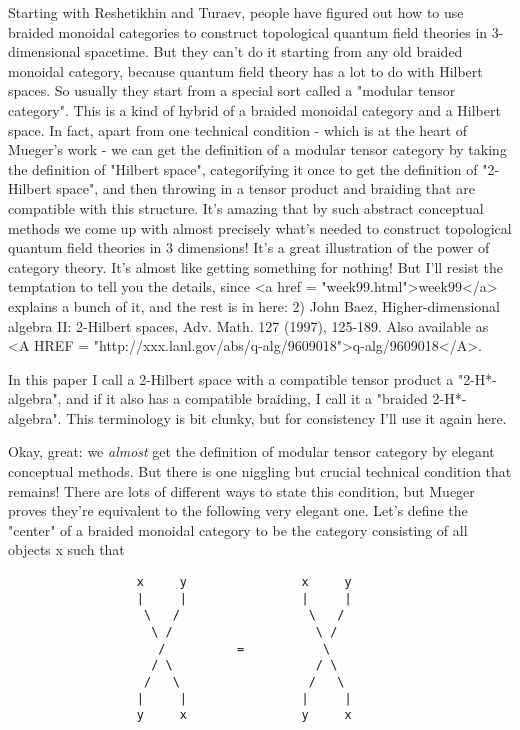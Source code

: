 Starting with Reshetikhin and Turaev, people have figured out
how to use braided monoidal categories to construct topological 
quantum field theories in 3-dimensional spacetime.  But they can't 
do it starting from any old braided monoidal category, because
quantum field theory has a lot to do with Hilbert spaces.  So usually 
they start from a special sort called a "modular tensor category".  
This is a kind of hybrid of a braided monoidal category and a Hilbert 
space.  
In fact, apart from one technical condition - which is at the
heart of Mueger's work - we can get the definition of a modular
tensor category by taking the definition of "Hilbert space", 
categorifying it once to get the definition of "2-Hilbert 
space", and then throwing in a tensor product and braiding 
that are compatible with this structure.   
It's amazing that by such abstract conceptual methods we come
up with almost precisely what's needed to construct topological
quantum field theories in 3 dimensions!  It's a great illustration
of the power of category theory.  It's almost like getting something 
for nothing!  But I'll resist the temptation to tell you the details, 
since <a href = "week99.html">week99</a> 
explains a bunch of it, and the rest is in here:
2) John Baez, Higher-dimensional algebra II: 2-Hilbert spaces,
Adv. Math. 127 (1997), 125-189.   Also available as 
<A HREF = "http://xxx.lanl.gov/abs/q-alg/9609018">q-alg/9609018</A>.

In this paper I call a 2-Hilbert space with a compatible tensor
product a "2-H*-algebra", and if it also has a compatible braiding,
I call it a "braided 2-H*-algebra".  This terminology is bit
clunky, but for consistency I'll use it again here.   

Okay, great: we \emph{almost} get the definition of modular tensor
category by elegant conceptual methods.  But there is one
niggling but crucial technical condition that remains!  There
are lots of different ways to state this condition, but Mueger
proves they're equivalent to the following very elegant one.
Let's define the "center" of a braided monoidal category to
be the category consisting of all objects x such that

\begin{verbatim}
                  x     y                x     y
                  |     |                |     |
                   \   /                  \   /
                    \ /                    \ /
                     /          =           \
                    / \                    / \
                   /   \                  /   \
                  |     |                |     |
                  y     x                y     x
\end{verbatim}
    
